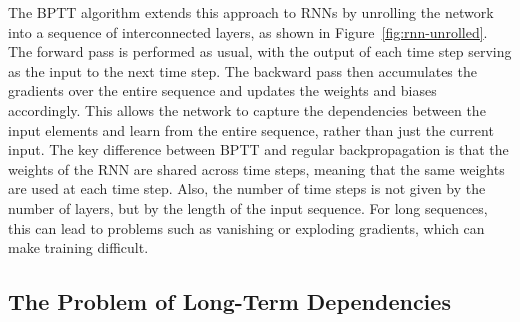 \documentclass{article}
\newcommand{\reffig}[1]{Figure~\ref{#1}}
\begin{document}
The BPTT algorithm extends this approach to RNNs by unrolling the network into a sequence
of interconnected layers, as shown in \reffig{fig:rnn-unrolled}. The forward pass is
performed as usual, with the output of each time step serving as the input to the next
time step. The backward pass then accumulates the gradients over the entire sequence and
updates the weights and biases accordingly. This allows the network to capture the
dependencies between the input elements and learn from the entire sequence, rather than
just the current input. The key difference between BPTT and regular backpropagation is
that the weights of the RNN are shared across time steps, meaning that the same weights
are used at each time step. Also, the number of time steps is not given by the number of
layers, but by the length of the input sequence. For long sequences, this can lead to
problems such as vanishing or exploding gradients, which can make training difficult.


\subsection{The Problem of Long-Term Dependencies}
\label{sec:2.3}
\end{document}
